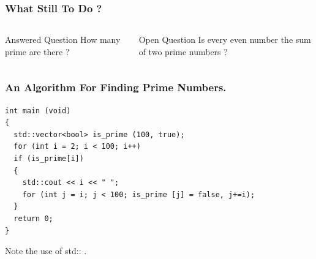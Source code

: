\documentclass[compress,t]{beamer}
\begin{document}
\begin{frame}
	\frametitle{What Still To Do ?}
	\begin{columns}
		\begin{block}{Answered Question}
			How many prime are there ?
		\end{block}
		
		\begin{block}{Open Question}
			Is every even number the sum of two prime numbers ?
		\end{block}
	\end{columns}
\end{frame}

\begin{frame}[fragile]
	\frametitle{An Algorithm For Finding Prime Numbers.}
	\begin{verbatim}
int main (void)
{
  std::vector<bool> is_prime (100, true);
  for (int i = 2; i < 100; i++)
  if (is_prime[i])
  {
    std::cout << i << " ";
    for (int j = i; j < 100; is_prime [j] = false, j+=i);
  }
  return 0;
}
    \end{verbatim}
		Note the use of \alert{std::} .
\end{frame}
\end{document}
